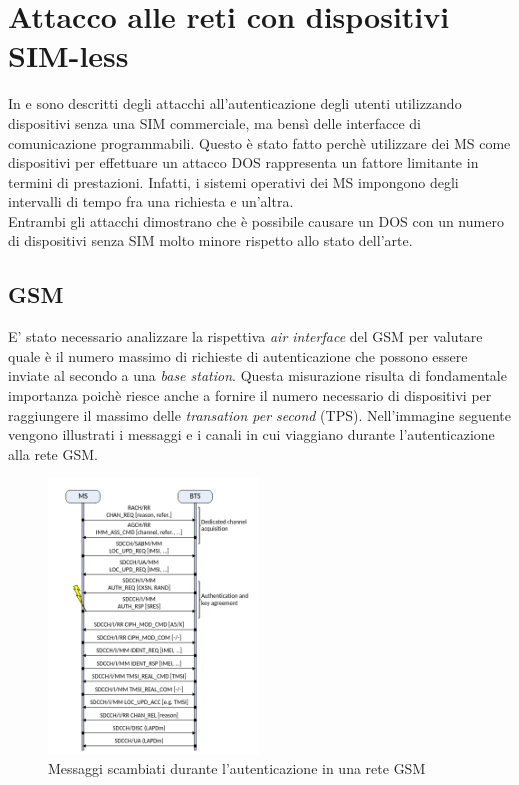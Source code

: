 \clearpage

\section{Attacco alle reti con dispositivi SIM-less}
In \cite{umts-dos} e \cite{gsm-dos-simless} sono descritti degli attacchi all'autenticazione degli utenti utilizzando dispositivi senza una SIM commerciale, ma bensì delle interfacce di comunicazione 
programmabili. Questo è stato fatto perchè utilizzare dei MS come dispositivi per effettuare un attacco DOS rappresenta un fattore limitante in termini di prestazioni. Infatti, 
i sistemi operativi dei MS impongono degli intervalli di tempo fra una richiesta e un'altra.\\
Entrambi gli attacchi dimostrano che è possibile causare un DOS con un numero di dispositivi senza SIM molto minore rispetto allo stato dell'arte. 
\subsection{GSM}
E' stato necessario analizzare la rispettiva \textit{air interface} del GSM per valutare quale è il numero massimo di richieste di autenticazione 
che possono essere inviate al secondo a una \textit{base station}. Questa misurazione risulta di fondamentale importanza poichè riesce anche a fornire il numero necessario 
di dispositivi per raggiungere il massimo delle \textit{transation per second} (TPS).
Nell'immagine seguente vengono illustrati i messaggi e i canali in cui viaggiano durante l'autenticazione alla rete GSM.
\begin{figure}[h]
    \centering
    \includegraphics[width=0.5\textwidth]{images/gsm-air-channel.png}
    \caption{Messaggi scambiati durante l'autenticazione in una rete GSM\cite{gsm-dos-simless}}
\end{figure}

